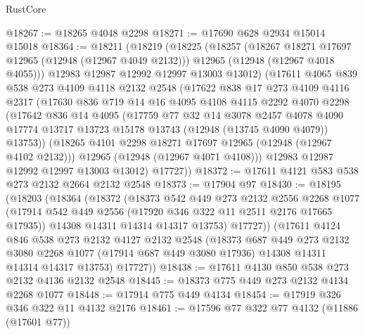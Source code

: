 \begin{lexlean}{RustCore}
\begin{coremodule}
@18267 := @18265 @4048 @2298
@18271 := @17690 @628 @2934 @15014 @15018
@18364 := @18211
    (@18219
      (@18225
        (@18257
          (@18267 @18271 @17697 @12965 (@12948 (@12967 @4049 @2132)))
          @12965
          (@12948 (@12967 @4018 @4055)))
        @12983
        @12987
        @12992
        @12997
        @13003
        @13012)
      (@17611
        @4065
        @839
        @538
        @273
        @4109
        @4118
        @2132
        @2548
        (@17622
          @838
          @17
          @273
          @4109
          @4116
          @2317
          (@17630
            @836
            @719
            @14
            @16
            @4095
            @4108
            @4115
            @2292
            @4070
            @2298
            (@17642
              @836
              @14
              @4095
              (@17759
                @77
                @32
                @14
                @3078
                @2457
                @4078
                @4090
                @17774
                @13717
                @13723
                @15178
                @13743
                (@12948 (@13745 @4090 @4079))
                @13753))
            (@18265 @4101 @2298 @18271 @17697 @12965 (@12948 (@12967 @4102 @2132)))
            @12965
            (@12948 (@12967 @4071 @4108)))
          @12983
          @12987
          @12992
          @12997
          @13003
          @13012)
        @17727))
@18372 := @17611 @4121 @583 @538 @273 @2132 @2664 @2132 @2548
@18373 := @17904 @97
@18430 := @18195
    (@18203
      (@18364
        (@18372
          (@18373
            @542
            @449
            @273
            @2132
            @2556
            @2268
            @1077
            (@17914 @542 @449 @2556 (@17920 @346 @322 @11 @2511 @2176 @17665 @17935))
            @14308
            @14311
            @14314
            @14317
            @13753)
          @17727))
      (@17611
        @4124
        @846
        @538
        @273
        @2132
        @4127
        @2132
        @2548
        (@18373
          @687
          @449
          @273
          @2132
          @3080
          @2268
          @1077
          (@17914 @687 @449 @3080 @17936)
          @14308
          @14311
          @14314
          @14317
          @13753)
        @17727))
@18438 := @17611 @4130 @850 @538 @273 @2132 @4136 @2132 @2548
@18445 := @18373 @775 @449 @273 @2132 @4134 @2268 @1077
@18448 := @17914 @775 @449 @4134
@18454 := @17919 @326 @346 @322 @11 @4132 @2176
@18461 := @17596 @77 @322 @77 @4132 (@11886 (@17601 @77))

\end{coremodule}
\end{lexlean}
